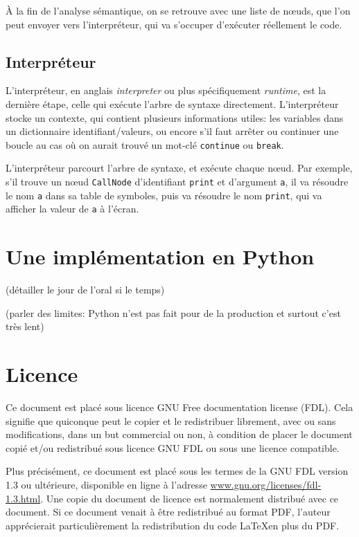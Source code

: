 \documentclass{article}
\begin{document}
À la fin de l’analyse sémantique, on se retrouve avec une liste de nœuds, que l’on peut envoyer
vers l’interpréteur, qui va s’occuper d’exécuter réellement le code.

\subsection{Interpréteur}
L’interpréteur, en anglais \textit{interpreter} ou plus spécifiquement \textit{runtime}, est la dernière
étape, celle qui exécute l’arbre de syntaxe directement.
L’interpréteur stocke un contexte, qui contient plusieurs informations utiles\nobreakspace:
les variables dans un dictionnaire identifiant/valeurs, ou encore s’il faut arrêter ou continuer
une boucle au cas où on aurait trouvé un mot-clé \verb|continue| ou \verb|break|.

L’interpréteur parcourt l’arbre de syntaxe, et exécute chaque nœud. Par exemple, s’il trouve un
nœud \verb|CallNode| d’identifiant \verb|print| et d’argument \verb|a|, il va résoudre le nom
\verb|a| dans sa table de symboles, puis va résoudre le nom \verb|print|, qui va afficher la 
valeur de \verb|a| à l’écran.

\section{Une implémentation en Python}
(détailler le jour de l’oral si le temps)

(parler des limites\nobreakspace: Python n’est pas fait pour de la production et surtout c’est
très lent)

\printbibliography

\section*{Licence}
Ce document est placé sous licence GNU Free documentation license (FDL).
Cela signifie que quiconque peut le copier et le redistribuer librement, avec ou
sans modifications, dans un but commercial ou non, à condition de placer le
document copié et/ou redistribué sous licence GNU FDL ou sous une licence
compatible.

Plus précisément, ce document est placé sous les termes de la GNU FDL version 1.3 ou
ultérieure, disponible en ligne à l’adresse
\href{www.gnu.org/licenses/fdl-1.3.html}{www.gnu.org/licenses/fdl-1.3.html}.
Une copie du document de licence est normalement distribué avec ce document.
Si ce document venait à être redistribué au format PDF, l’auteur apprécierait
particulièrement la redistribution du code \LaTeX\nobreakspace en plus du PDF.
\end{document}
